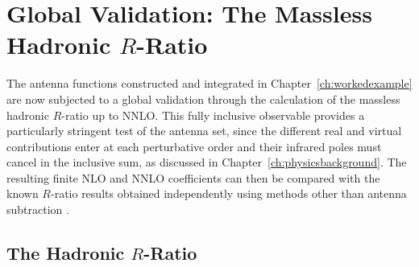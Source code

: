 \chapter{Global Validation: The Massless Hadronic \texorpdfstring{$R$}{R}-Ratio}\label{ch:validation}

The antenna functions constructed and integrated in Chapter~\ref{ch:workedexample} are now
subjected to a global validation through the calculation of the massless hadronic $R$-ratio up to
NNLO. This fully inclusive observable provides a particularly stringent test of the antenna set,
since the different real and virtual contributions enter at each perturbative order and their
infrared poles must cancel in the inclusive sum, as discussed in
Chapter~\ref{ch:physicsbackground}. The resulting finite NLO and NNLO coefficients can then be
compared with the known $R$-ratio results obtained independently using methods other than antenna
subtraction \cite{Dine:1979qh}.

\section{The Hadronic $R$-Ratio}\label{sec:rratioDef}

